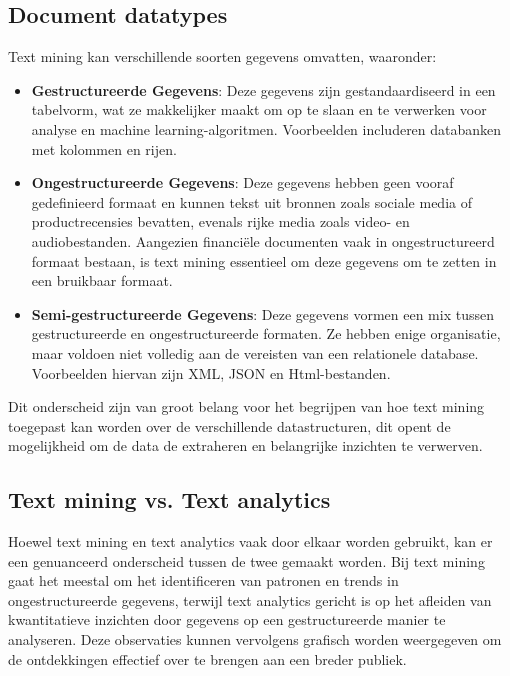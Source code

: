\subsection{Document datatypes}
Text mining kan verschillende soorten gegevens omvatten, waaronder:

\begin{itemize}
  \item \textbf{Gestructureerde Gegevens}: Deze gegevens zijn gestandaardiseerd in een tabelvorm, wat ze makkelijker maakt om op te slaan en te verwerken voor analyse en machine learning-algoritmen. Voorbeelden includeren databanken met kolommen en rijen.
  \item \textbf{Ongestructureerde Gegevens}: Deze gegevens hebben geen vooraf gedefinieerd formaat en kunnen tekst uit bronnen zoals sociale media of productrecensies bevatten, evenals rijke media zoals video- en audiobestanden. Aangezien financiële documenten vaak in ongestructureerd formaat bestaan, is text mining essentieel om deze gegevens om te zetten in een bruikbaar formaat.
  \item \textbf{Semi-gestructureerde Gegevens}: Deze gegevens vormen een mix tussen gestructureerde en ongestructureerde formaten. Ze hebben enige organisatie, maar voldoen niet volledig aan de vereisten van een relationele database. Voorbeelden hiervan zijn XML, JSON en Html-bestanden.
\end{itemize}

Dit onderscheid zijn van groot belang voor het begrijpen van hoe text mining toegepast kan worden over de verschillende datastructuren, dit opent de mogelijkheid om de data de extraheren en belangrijke inzichten te verwerven\autocite{AWS2024}.

\subsection{Text mining vs. Text analytics}
Hoewel text mining en text analytics vaak door elkaar worden gebruikt, kan er een genuanceerd onderscheid tussen de twee gemaakt worden. Bij text mining gaat het meestal om het identificeren van patronen en trends in ongestructureerde gegevens, terwijl text analytics gericht is op het afleiden van kwantitatieve inzichten door gegevens op een gestructureerde manier te analyseren. Deze observaties kunnen vervolgens grafisch worden weergegeven om de ontdekkingen effectief over te brengen aan een breder publiek.\autocite{IBM2024}

